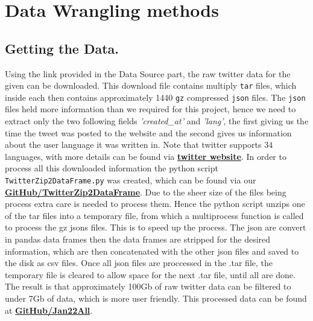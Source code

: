 \documentclass[9pt]{article}
\begin{document}
\section{Data Wrangling methods}
\subsection{Getting the Data.}
Using the link provided in the Data Source part, the raw twitter data for the given can be
downloaded. This download file contains multiply \texttt{tar} files, which inside each
then contains approximately 1440 \texttt{gz} compressed \texttt{json} files. The
\texttt{json} files held more information than we required for this project, hence we need
to extract only the two following fields \emph{'created\_at'} and \emph{'lang'}, the first
giving us the
time the tweet was posted to the website and the second gives us information about the
user language it was written in. Note that twitter supports $34$ languages, with more
details can be found via
\href{https://developer.twitter.com/en/docs/twitter-for-websites/supported-languages}{\color{blue}
\textbf{twitter website}}.
In order to process all this downloaded information the python script
\texttt{TwitterZip2DataFrame.py} was created, which can be found via our
\href{https://github.com/JamesZor/data-WranglingProject/blob/main/TwitterZip2DataFrame.py}{\color{blue}\textbf{GitHub/TwitterZip2DataFrame}}.
Due to the sheer size of the files being process extra care is needed to process them.
Hence the python script unzips one of the tar files into a temporary file, from which a
multiprocess function is called to process the gz jsons files. 
This is to speed up the process. The json are convert in pandas data frames then the data frames
are stripped for the desired information, which are then concatenated with the other json
files and saved to the disk as csv files.  
Once all json files are proccessed in the .tar file, the temporary file is cleared to allow space 
for the next .tar file, until all are done. The result is that approximately 100Gb of raw twitter 
data can be filtered to under 7Gb of data, which is more user friendly. This processed
data can be found at
\href{https://github.com/JamesZor/data-WranglingProject/tree/main/dataSets/jan22All}{\color{blue}
\textbf{GitHub/Jan22All}}.
\end{document}
